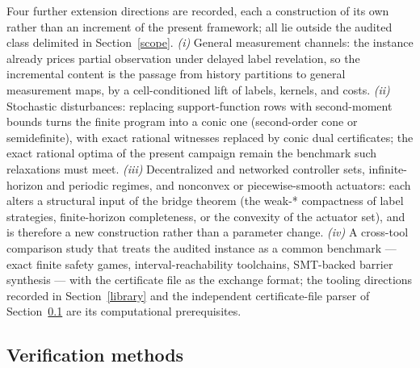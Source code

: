 \documentclass[10pt,twocolumn]{article}
\theoremstyle{plain}
\theoremstyle{definition}
\theoremstyle{remark}
\begin{document}
Four further extension directions are recorded, each a construction of
its own rather than an increment of the present framework; all lie outside
the audited class delimited in Section~\ref{scope}.
\emph{(i)} General measurement channels: the instance already prices
partial observation under delayed label revelation, so the incremental
content is the passage from history partitions to general measurement
maps, by a cell-conditioned lift of labels, kernels, and costs.
\emph{(ii)} Stochastic disturbances: replacing support-function rows with
second-moment bounds turns the finite program into a conic one
(second-order cone or semidefinite), with exact rational witnesses
replaced by conic dual certificates; the exact rational optima of the
present campaign remain the benchmark such relaxations must meet.
\emph{(iii)} Decentralized and networked controller sets, infinite-horizon
and periodic regimes, and nonconvex or piecewise-smooth actuators: each
alters a structural input of the bridge theorem (the weak-* compactness
of label strategies, finite-horizon completeness, or the convexity of
the actuator set), and is therefore a new construction rather than a
parameter change.
\emph{(iv)} A cross-tool comparison study that treats the audited
instance as a common benchmark --- exact finite safety games,
interval-reachability toolchains, SMT-backed barrier synthesis --- with
the certificate file as the exchange format; the tooling directions
recorded in Section~\ref{library} and the independent
certificate-file parser of Section~\ref{methods} are its computational
prerequisites.

\subsection{Verification methods}\label{methods}
\end{document}
